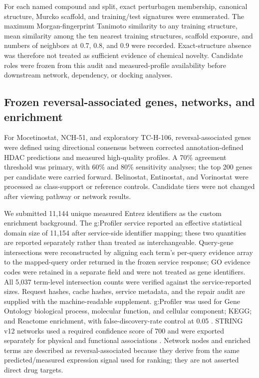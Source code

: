 For each named compound and split, exact perturbagen membership, canonical structure, Murcko scaffold, and training/test signatures were enumerated. The maximum Morgan-fingerprint Tanimoto similarity to any training structure, mean similarity among the ten nearest training structures, scaffold exposure, and numbers of neighbors at 0.7, 0.8, and 0.9 were recorded. Exact-structure absence was therefore not treated as sufficient evidence of chemical novelty. Candidate roles were frozen from this audit and measured-profile availability before downstream network, dependency, or docking analyses.

\subsection{Frozen reversal-associated genes, networks, and enrichment}

For Mocetinostat, NCH-51, and exploratory TC-H-106, reversal-associated genes were defined using directional consensus between corrected annotation-defined HDAC predictions and measured high-quality profiles. A 70\% agreement threshold was primary, with 60\% and 80\% sensitivity analyses; the top 200 genes per candidate were carried forward. Belinostat, Entinostat, and Vorinostat were processed as class-support or reference controls. Candidate tiers were not changed after viewing pathway or network results.

We submitted 11,144 unique measured Entrez identifiers as the custom enrichment background. The g:Profiler service reported an effective statistical domain size of 11,154 after service-side identifier mapping; these two quantities are reported separately rather than treated as interchangeable. Query-gene intersections were reconstructed by aligning each term's per-query evidence array to the mapped-query order returned in the frozen service response; GO evidence codes were retained in a separate field and were not treated as gene identifiers. All 5,037 term-level intersection counts were verified against the service-reported sizes. Request hashes, cache hashes, service metadata, and the repair audit are supplied with the machine-readable supplement. g:Profiler was used for Gene Ontology biological process, molecular function, and cellular component; KEGG; and Reactome enrichment, with false-discovery-rate control at 0.05 \cite{kolberg2023}. STRING v12 networks used a required confidence score of 700 and were exported separately for physical and functional associations \cite{szklarczyk2023}. Network nodes and enriched terms are described as reversal-associated because they derive from the same predicted/measured expression signal used for ranking; they are not asserted direct drug targets.

